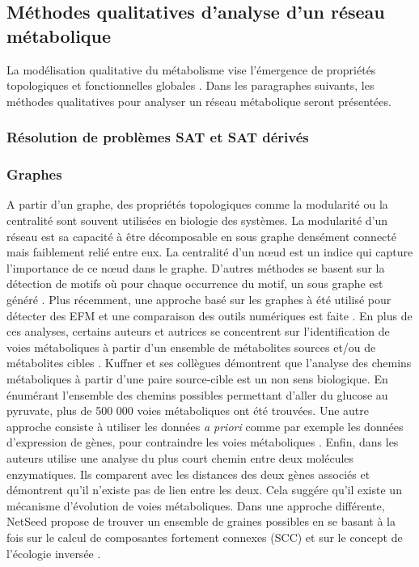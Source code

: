 \documentclass[../main.tex]{subfiles}
\begin{document}
\newpage

\subsection{Méthodes qualitatives d'analyse d'un réseau métabolique}
La modélisation qualitative du métabolisme vise l'émergence de propriétés topologiques et fonctionnelles globales \citep{Steuer2007}. Dans les paragraphes suivants, les méthodes qualitatives pour analyser un réseau métabolique seront présentées.

\subsubsection{Résolution de problèmes SAT et SAT dérivés }

\subsubsection{Graphes}
A partir d'un graphe, des propriétés topologiques comme la modularité \citep{Holme2011} ou la centralité \citep{Kim2019} sont souvent utilisées en biologie des systèmes. La modularité d'un réseau est sa capacité à être décomposable en sous graphe densément connecté mais faiblement relié entre eux. La centralité d'un n\oe{}ud est un indice qui capture l'importance de ce n\oe{}ud dans le graphe. D'autres méthodes se basent sur la détection de motifs où pour chaque occurrence du motif, un sous graphe est généré \citep{Lacroix2006}. Plus récemment, une approche basé sur les graphes à été utilisé pour détecter des EFM et une comparaison des outils numériques est faite \citep{Arabzadeh2018}. En plus de ces analyses, certains auteurs et autrices se concentrent sur l'identification de voies métaboliques à partir d'un ensemble de métabolites sources et/ou de métabolites cibles \citep{Heiden2002}. Kuffner \citep{kuffner2000} et ses collègues démontrent que l'analyse des chemins métaboliques à partir d'une paire source-cible est un non sens biologique. En énumérant l'ensemble des chemins possibles permettant d'aller du glucose au pyruvate, plus de 500 000 voies métaboliques ont été trouvées. Une autre approche consiste à utiliser les données  \textit{a priori} comme par exemple les données d'expression de gènes, pour contraindre les voies métaboliques \citep{Zien2000}. Enfin, dans \citep{Simeonidis2003} les auteurs utilise une analyse du plus court chemin entre deux molécules enzymatiques. Ils comparent avec les distances des deux gènes associés et démontrent qu'il n'existe pas de lien entre les deux. Cela suggére qu'il existe un mécanisme d'évolution de voies métaboliques. Dans une approche différente, NetSeed propose de trouver un ensemble de graines possibles en se basant à la fois sur le calcul de composantes fortement connexes (SCC) et sur le concept de l'écologie inversée \citep{Carr2012}.
 
\end{document}
